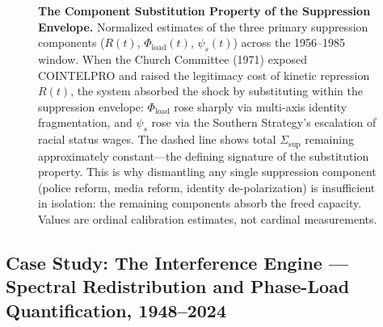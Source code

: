 \begin{figure}[htbp]
\caption{\textbf{The Component Substitution Property of the Suppression Envelope.} Normalized estimates of the three primary suppression components ($R(t)$, $\Phi_{\text{load}}(t)$, $\psi_s(t)$) across the 1956--1985 window. When the Church Committee (1971) exposed COINTELPRO and raised the legitimacy cost of kinetic repression $R(t)$, the system absorbed the shock by substituting within the suppression envelope: $\Phi_{\text{load}}$ rose sharply via multi-axis identity fragmentation, and $\psi_s$ rose via the Southern Strategy's escalation of racial status wages. The dashed line shows total $\Sigma_{\text{sup}}$ remaining approximately constant---the defining signature of the substitution property. This is why dismantling any single suppression component (police reform, media reform, identity de-polarization) is insufficient in isolation: the remaining components absorb the freed capacity. Values are ordinal calibration estimates, not cardinal measurements.}
\label{fig:suppression_substitution}
\end{figure}

\subsection*{Case Study: The Interference Engine --- Spectral Redistribution and Phase-Load Quantification, 1948--2024}
\label{cs:interference_engine}

